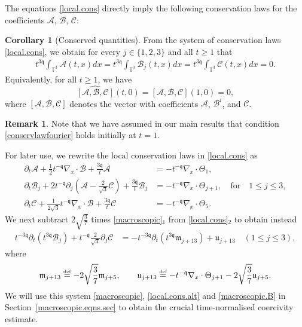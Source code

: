 \documentclass[reqno]{amsart}
\newcommand{\eqdef }{\overset{\mbox{\tiny{def}}}{=}}
\newcommand{\secref}[1]{Section~\ref{#1}}
\newcommand{\qq}{\mathfrak{q}}
\newcommand{\tmq}{t^{-\qq}}
\newcommand{\tTq}{t^{3\qq}}
\newcommand{\tmTq}{t^{-3\qq}}
\newcommand{\highG}{\Theta}
\theoremstyle{definition}
\newtheorem{corollary}[theorem]{Corollary}
\newtheorem{remark}[theorem]{Remark}
\numberwithin{equation}{section}
\numberwithin{theorem}{section}
\begin{document}
The equations \eqref{local.cons} directly imply the following conservation laws for the coefficients $\mathcal{A}$, $\mathcal{B}$, $\mathcal{C}$:

\begin{corollary}[Conserved quantities]
	\label{L8.5}  From the system of conservation laws  \eqref{local.cons},  we obtain for every \(j\in\{1,2,3\}\) and all $t\geq 1$ that
\begin{align*}
   	\tTq\int_{\mathbb{T}^3} \mathcal{A}(t,x)dx=\tTq\int_{\mathbb{T}^3} \mathcal{B}_{j}(t,x)dx=\tTq\int_{\mathbb{T}^3} \mathcal{C}(t,x)dx=0. 
\end{align*}
    Equivalently, for all $t\geq 1$, we have 
    \begin{equation}\label{conservlawfourier}
\widehat{[\mathcal{A},\mathcal{B},\mathcal{C}]}(t,0)=\widehat{[\mathcal{A},\mathcal{B},\mathcal{C}]}(1,0)=0,
\end{equation}
where $[\mathcal{A},\mathcal{B},\mathcal{C}]$ denotes the vector with coefficients \(\mathcal{A}\), \(\mathcal{B}^i\), and \(\mathcal{C}\).
\end{corollary}

\begin{remark}
    Note that we have assumed in our main results that condition \eqref{conservlawfourier} holds initially at $t=1$.
\end{remark}

For later use, we  rewrite the local conservation laws in \eqref{local.cons} as
\begin{equation}\label{local.cons.alt}
\begin{split}
 \partial_t  \mathcal{A} 
     +
\frac{1}{2}  \tmq \nabla_x \cdot \mathcal{B}
+
\frac{3\qq }{t} {\mathcal{A}}
&=-\tmq \nabla_x \cdot \highG_{1},
\\ 
\partial_t \mathcal{B}_{j} 
 +
2\tmq\partial_j \left( \mathcal{A}
-\frac{2}{\sqrt{3}}
\mathcal{C}  \right)
+
\frac{3\qq }{t} {\mathcal{B}_{j}}
&=-\tmq \nabla_x \cdot \highG_{j+1}, \quad \text{for}\quad 1 \leq j \leq 3,
\\ 
\partial_t  \mathcal{C} 
  +
\frac{1}{2\sqrt{3}}  \tmq \nabla_x \cdot \mathcal{B} 
+
\frac{3\qq }{t} {\mathcal{C}}
&=-\tmq \nabla_x \cdot \highG_{5}.
\end{split}
\end{equation}
We next subtract $2\sqrt{\frac{3}{7}}$ times \eqref{macroscopic}$_1$ from \eqref{local.cons}$_2$ to obtain instead 
\begin{align}\label{macroscopic.B}
 \tmTq\partial_t \left(\tTq \mathcal{B}_{j} \right) 
 +
\tmq\frac{2}{\sqrt{3}}\partial_j \mathcal{C}  
&=
-\tmTq  \partial_t\left( \tTq \mathfrak{m}_{j+13} \right)+\mathfrak{u}_{j+13}\quad  (1 \leq j \leq 3),
\end{align}
where
\begin{align*}
\mathfrak{m}_{j+13}  \eqdef  -2\sqrt{\frac{3}{7}}\mathfrak{m}_{j+5}, \qquad 
\mathfrak{u}_{j+13} \eqdef  -\tmq \nabla_x \cdot \highG_{j+1}-2\sqrt{\frac{3}{7}}\mathfrak{u}_{j+5}.
\end{align*}
We will use this system \eqref{macroscopic}, \eqref{local.cons.alt} and \eqref{macroscopic.B} in \secref{macroscopic.eqns.sec} to obtain the crucial time-normalised coercivity estimate.
\end{document}
